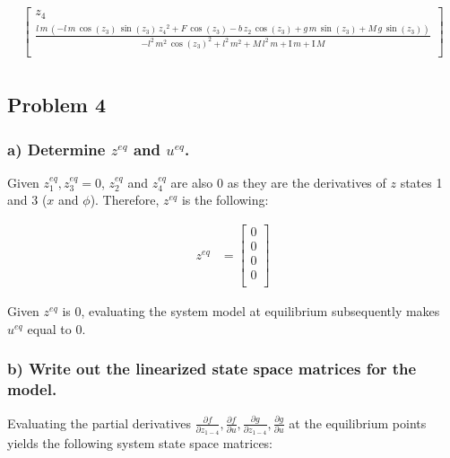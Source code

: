 \documentclass[12pt, letterpaper, onecolumn]{article}
\begin{document}
\begin{equation*}
\begin{split}
\begin{bmatrix}
            z_4                                                                                                                                                                                                                                                                                                                               \\
            \frac{l\,m\,{\left(-l\,m\,\cos \left(z_3 \right)\,\sin \left(z_3 \right)\,{z_4 }^2 +F\,\cos \left(z_3 \right)-b\,z_2 \,\cos \left(z_3 \right)+g\,m\,\sin \left(z_3 \right)+M\,g\,\sin \left(z_3 \right)\right)}}{-l^2 \,m^2 \,{\cos \left(z_3 \right)}^2 +l^2 \,m^2 +M\,l^2 \,m+\textrm{I}\,m+\textrm{I}\,M}                      \\
        \end{bmatrix} \\
    \end{split}
\end{equation*}

\subsection*{Problem 4}
\subsubsection*{a) Determine $z^{eq}$ and $u^{eq}$.}
Given $z_1^{eq}, z_3^{eq} = 0$, $z_2^{eq}$ and $z_4^{eq}$ are also 0 as they are the derivatives of $z$ states 1 and 3 ($x$ and $\phi$). Therefore, $z^{eq}$ is the following:

\begin{equation*}
    \begin{split}
        z^{eq} & =
        \begin{bmatrix}
            0 \\
            0 \\
            0 \\
            0 \\
        \end{bmatrix}
    \end{split}
\end{equation*}

Given $z^{eq}$ is 0, evaluating the system model at equilibrium subsequently makes $u^{eq}$ equal to 0.


\subsubsection*{b) Write out the linearized state space matrices for the model.}
Evaluating the partial derivatives $\frac{\partial f}{\partial z_{1-4}},\frac{\partial f}{\partial u},\frac{\partial g}{\partial z_{1-4}},\frac{\partial g}{\partial u}$ at the equilibrium points yields the following system state space matrices:
\end{document}
